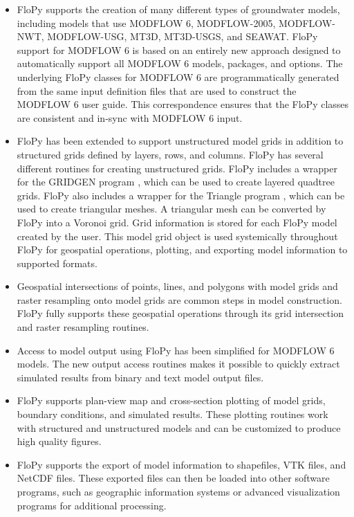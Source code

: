 \documentclass[12pt, oneside]{article}  	%
\begin{document}
\begin{itemize}
\item FloPy supports the creation of many different types of groundwater models, including models that use MODFLOW 6, MODFLOW-2005, MODFLOW-NWT, MODFLOW-USG, MT3D, MT3D-USGS, and SEAWAT. FloPy support for MODFLOW 6 is based on an entirely new approach designed to automatically support all MODFLOW 6 models, packages, and options. The underlying FloPy classes for MODFLOW 6 are programmatically generated from the same input definition files that are used to construct the MODFLOW 6 user guide. This correspondence ensures that the FloPy classes are consistent and in-sync with MODFLOW 6 input.

\item FloPy has been extended to support unstructured model grids in addition to structured grids defined by layers, rows, and columns. FloPy has several different routines for creating unstructured grids. FloPy includes a wrapper for the GRIDGEN program \citep{gridgen}, which can be used to create layered quadtree grids. FloPy also includes a wrapper for the Triangle program \citep{trianglemesh}, which can be used to create triangular meshes. A triangular mesh can be converted by FloPy into a Voronoi grid. Grid information is stored for each FloPy model created by the user. This model grid object is used systemically throughout FloPy for geospatial operations, plotting, and exporting model information to supported formats.

\item Geospatial intersections of points, lines, and polygons with model grids and raster resampling onto model grids are common steps in model construction. FloPy fully supports these geospatial operations through its grid intersection and raster resampling routines.

\item Access to model output using FloPy has been simplified for MODFLOW 6 models. The new output access routines makes it possible to quickly extract simulated results from binary and text model output files.

\item FloPy supports plan-view map and cross-section plotting of model grids, boundary conditions, and simulated results. These plotting routines work with structured and unstructured models and can be customized to produce high quality figures.

\item FloPy supports the export of model information to shapefiles, VTK files, and NetCDF files. These exported files can then be loaded into other software programs, such as geographic information systems or advanced visualization programs for additional processing.

\end{itemize}
\end{document}
